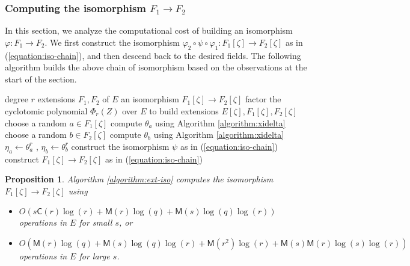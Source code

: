 \documentclass[12pt]{article}
\theoremstyle{plain}
\newtheorem{proposition}[theorem]{Proposition}
\theoremstyle{definition}
\def\MM{\ensuremath{\mathsf{M}}}
\def\CC{\ensuremath{\mathsf{C}}}
\newcounter{algorithm}
\begin{document}

\subsubsection{Computing the isomorphism $F_1 \rightarrow F_2$}

In this section, we analyze the computational cost of building an isomorphism $\varphi: F_1 
\rightarrow F_2$. We first construct the isomorphism $\varphi_2 \circ \psi \circ \varphi_1 : 
F_1[\zeta] \rightarrow F_2[\zeta]$ as in (\ref{equation:iso-chain}), and then descend back to the 
desired fields. The following algorithm builds the above chain of isomorphism based on the 
observations at the start of the section. 
\begin{algorithm}
	\label{algorithm:ext-iso}
	\begin{algorithmic}[1]
		\REQUIRE degree $r$ extensions $F_1, F_2$ of $E$
		\ENSURE an isomorphism $F_1[\zeta] \rightarrow F_2[\zeta]$
		\STATE\label{step:factor-cyclo} factor the cyclotomic polynomial $\Phi_r(Z)$ over $E$ to 
		build extensions $E[\zeta],	F_1[\zeta], F_2[\zeta]$
		\REPEAT
		\STATE choose a random $a \in F_1[\zeta]$
		\STATE compute $\theta_a$ using Algorithm \ref{algorithm:xidelta}
		\REPEAT
		\STATE choose a random $b \in F_2[\zeta]$
		\STATE compute $\theta_b$ using Algorithm \ref{algorithm:xidelta}
		\STATE\label{step:gamma-pow} $\eta_a \leftarrow \theta_a^r$ , $\eta_b \leftarrow \theta_b^r$
		\STATE\label{step:psi} construct the isomorphism $\psi$ as in (\ref{equation:iso-chain})
		\STATE construct $F_1[\zeta] \rightarrow F_2[\zeta]$ as in (\ref{equation:iso-chain})
	\end{algorithmic}
\end{algorithm}
\begin{proposition}
	Algorithm \ref{algorithm:ext-iso} computes the isomorphism $F_1[\zeta] \rightarrow F_2[\zeta]$ 
	using
	\begin{itemize}
		\item $O(s\CC(r)\log(r) + \MM(r)\log(q) + \MM(s)\log(q)\log(r))$\\ operations in $E$ for 
		small $s$, or
		\item $O(\MM(r)\log(q) + \MM(s)\log(q)\log(r) + \MM(r^2)\log(r) +  
		\MM(s)\MM(r)\log(s)\log(r))$\\ 
		operations in $E$ for large $s$.
	\end{itemize}
\end{proposition}
\end{document}
